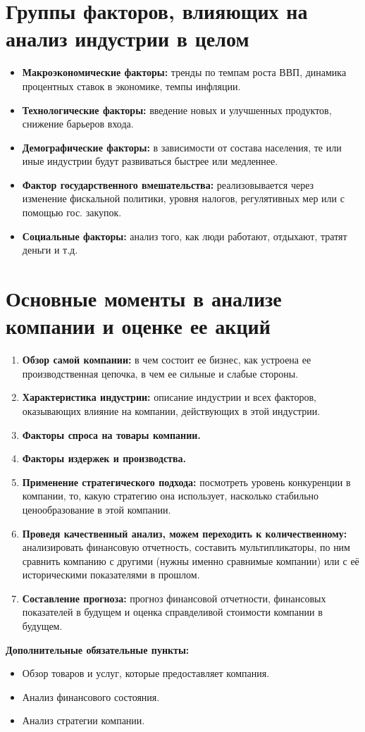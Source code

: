 \documentclass{article}
\begin{document}
	\section{Группы факторов, влияющих на анализ индустрии в целом}
	\begin{itemize}
		\item \textbf{Макроэкономические факторы:} тренды по темпам роста ВВП, динамика процентных ставок в экономике, темпы инфляции.
	\item \textbf{Технологические факторы:} введение новых и улучшенных продуктов, снижение барьеров входа.
	\item \textbf{Демографические факторы:} в зависимости от состава населения, те или иные индустрии будут развиваться быстрее или медленнее.
	\item \textbf{Фактор государственного вмешательства:} реализовывается через изменение фискальной политики, уровня налогов, регулятивных мер или с помощью гос. закупок.
	\item \textbf{Социальные факторы:} анализ того, как люди работают, отдыхают, тратят деньги и т.д.
		\end{itemize}
	
	
	\section{Основные моменты в анализе компании и оценке ее акций}
	\begin{enumerate}
		\item \textbf{Обзор самой компании:} в чем состоит ее бизнес, как устроена ее производственная цепочка, в чем ее сильные и слабые стороны.
		\item \textbf{Характеристика индустрии:} описание индустрии и всех факторов, оказывающих влияние на компании, действующих в этой индустрии.
		\item \textbf{Факторы спроса на товары компании.}
		\item \textbf{Факторы издержек и производства.}
		\item \textbf{Применение стратегического подхода:} посмотреть уровень конкуренции в компании, то, какую стратегию она использует, насколько стабильно ценообразование в этой компании.
		\item \textbf{Проведя качественный анализ, можем переходить к количественному:} анализировать финансовую отчетность, составить мультипликаторы, по ним сравнить компанию с другими (нужны именно сравнимые компании) или с её историческими показателями в прошлом.
		\item \textbf{Составление прогноза:} прогноз финансовой отчетности, финансовых показателей в будущем и оценка справделивой стоимости компании в будущем.
	\end{enumerate}
	
	\textbf{Дополнительные обязательные пункты:}
	\begin{itemize}
		\item Обзор товаров и услуг, которые предоставляет компания.
		\item Анализ финансового состояния.
		\item Анализ стратегии компании.
	\end{itemize}
	
\end{document}

